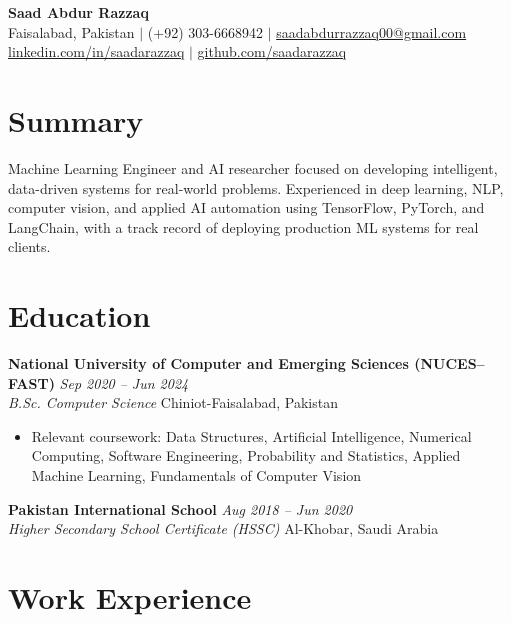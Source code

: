 \documentclass[11pt,a4paper]{article}
\newcommand{\entry}[4]{%
  \noindent\textbf{#1} \hfill \textit{#2}\\
  \textit{#3} \hfill #4\\[2pt]
}
\begin{document}
\begin{center}
    {\LARGE \bfseries Saad Abdur Razzaq}\\[4pt]
    Faisalabad, Pakistan \quad $\vert$ \quad (+92) 303-6668942 \quad $\vert$ \quad
    \href{mailto:saadabdurrazzaq00@gmail.com}{saadabdurrazzaq00@gmail.com}\\[2pt]
    \href{https://linkedin.com/in/saadarazzaq/}{linkedin.com/in/saadarazzaq} \quad $\vert$ \quad
    \href{https://github.com/saadarazzaq}{github.com/saadarazzaq}
\end{center}

\section*{Summary}
Machine Learning Engineer and AI researcher focused on developing intelligent, data-driven systems
for real-world problems. Experienced in deep learning, NLP, computer vision, and applied AI
automation using TensorFlow, PyTorch, and LangChain, with a track record of deploying production
ML systems for real clients.

\section*{Education}

\entry{National University of Computer and Emerging Sciences (NUCES--FAST)}{Sep 2020 -- Jun 2024}
      {B.Sc. Computer Science}{Chiniot-Faisalabad, Pakistan}
\begin{itemize}
    \item Relevant coursework: Data Structures, Artificial Intelligence, Numerical Computing,
          Software Engineering, Probability and Statistics, Applied Machine Learning,
          Fundamentals of Computer Vision
\end{itemize}

\vspace{4pt}
\entry{Pakistan International School}{Aug 2018 -- Jun 2020}
      {Higher Secondary School Certificate (HSSC)}{Al-Khobar, Saudi Arabia}

\section*{Work Experience}
\end{document}
